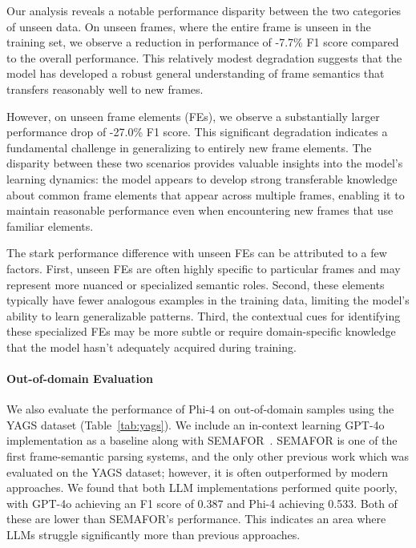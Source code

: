 
Our analysis reveals a notable performance disparity between the two categories of unseen data. On unseen frames, where the entire frame is unseen in the training set, we observe a reduction in performance of -7.7\% F1 score compared to the overall performance. This relatively modest degradation suggests that the model has developed a robust general understanding of frame semantics that transfers reasonably well to new frames.

However, on unseen frame elements (FEs), we observe a substantially larger performance drop of -27.0\% F1 score. This significant degradation indicates a fundamental challenge in generalizing to entirely new frame elements. The disparity between these two scenarios provides valuable insights into the model's learning dynamics: the model appears to develop strong transferable knowledge about common frame elements that appear across multiple frames, enabling it to maintain reasonable performance even when encountering new frames that use familiar elements.

The stark performance difference with unseen FEs can be attributed to a few factors. First, unseen FEs are often highly specific to particular frames and may represent more nuanced or specialized semantic roles. Second, these elements typically have fewer analogous examples in the training data, limiting the model's ability to learn generalizable patterns. Third, the contextual cues for identifying these specialized FEs may be more subtle or require domain-specific knowledge that the model hasn't adequately acquired during training.



\paragraph{Out-of-domain Evaluation}
We also evaluate the performance of Phi-4 on out-of-domain samples using the YAGS dataset (Table~\ref{tab:yags}). We include an in-context learning GPT-4o implementation as a baseline along with SEMAFOR~\cite{das-etal-2014-frame}. SEMAFOR is one of the first frame-semantic parsing systems, and the only other previous work which was evaluated on the YAGS dataset; however, it is often outperformed by modern approaches. We found that both LLM implementations performed quite poorly, with GPT-4o achieving an F1 score of 0.387 and Phi-4 achieving 0.533. Both of these are lower than SEMAFOR's performance. This indicates an area where LLMs struggle significantly more than previous approaches. 

